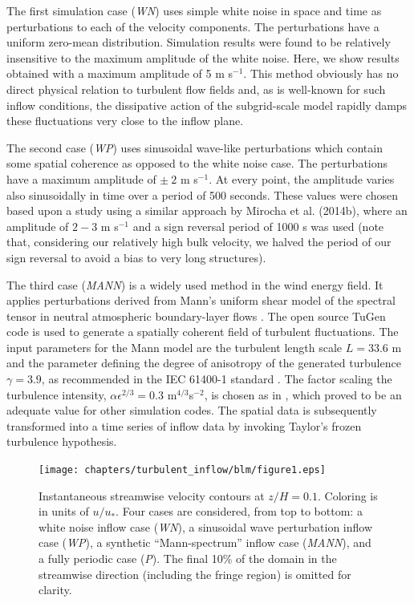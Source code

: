 	The first simulation case (\emph{WN}) uses simple white noise in space and time as perturbations to each of the velocity components.  The perturbations have a uniform zero-mean distribution. Simulation results were found to be relatively insensitive to the maximum amplitude of the white noise. Here, we show results obtained with a maximum amplitude of 5 m s$^{-1}$. This method obviously has no direct physical relation to turbulent flow fields and, as is well-known for such inflow conditions, the dissipative action of the subgrid-scale model rapidly damps these fluctuations very close to the inflow plane. 
	
	The second case (\emph{WP}) uses sinusoidal wave-like perturbations which contain some spatial coherence as opposed to the white noise case. The perturbations have a maximum amplitude of $\pm~2$ m s$^{-1}$. At every point, the amplitude varies also sinusoidally in time over a period of 500 seconds. These values were chosen based upon a study using a similar approach by Mirocha et al. (2014b), where an amplitude of $2-3$ m s$^{-1}$ and a sign reversal period of 1000 s was used (note that, considering our relatively high bulk velocity, we halved the period of our sign reversal to avoid a bias to very long structures). 
	
	The third case (\emph{MANN}) is a widely used method in the wind energy field. It applies perturbations derived from Mann's uniform shear
	model of the spectral tensor in neutral atmospheric boundary-layer flows \citep{mann1998wind}. The open source TuGen code
	\citep{gilling2009tugen} is used to generate a spatially coherent field of turbulent fluctuations. The input parameters for the Mann model are
	the turbulent length scale $L = 33.6$ m and the parameter defining the degree of anisotropy of the generated turbulence $\gamma = 3.9$, as
	recommended in the IEC 61400-1 standard \citep{IEC61400-1}. The factor scaling the turbulence intensity, $\alpha \epsilon^{2/3} = 0.3$ m$^{4/3}$s$^{-2}$, is chosen as in \cite{van2014cfd}, which proved to be an adequate value for other simulation codes. The spatial data is subsequently transformed into a time series of inflow data by invoking Taylor's frozen turbulence hypothesis.
	
	\begin{figure}[ht!]
		\centering
		\texttt{[image: chapters/turbulent\_inflow/blm/figure1.eps]}
		\caption{Instantaneous streamwise velocity contours at $z/H = 0.1$. Coloring is in units of $u/u_*$.  Four cases are considered, from top to bottom: a white noise inflow case (\emph{WN}), a sinusoidal wave perturbation inflow case (\emph{WP}), a synthetic ``Mann-spectrum'' inflow case (\emph{MANN}), and a fully periodic case (\emph{P}). The final 10\% of the domain in the streamwise direction (including the fringe region) is omitted for clarity.}
		\label{fig:snapshots_top}
	\end{figure}
	
